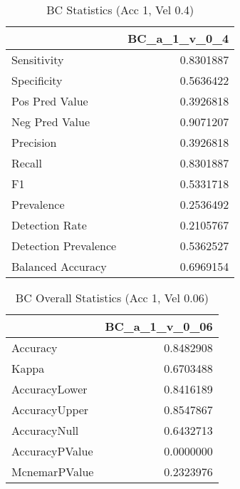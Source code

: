 \documentclass[]{article}
\begin{document}
\begin{table}[!h]

\caption{\label{tab:bc_accuracy_chunk}BC Statistics (Acc 1, Vel 0.4)}
\centering
\begin{tabular}[t]{lr}
\toprule
  & BC\_a\_1\_v\_0\_4\\
\midrule
Sensitivity & 0.8301887\\
Specificity & 0.5636422\\
Pos Pred Value & 0.3926818\\
Neg Pred Value & 0.9071207\\
Precision & 0.3926818\\
\addlinespace
Recall & 0.8301887\\
F1 & 0.5331718\\
Prevalence & 0.2536492\\
Detection Rate & 0.2105767\\
Detection Prevalence & 0.5362527\\
Balanced Accuracy & 0.6969154\\
\bottomrule
\end{tabular}
\end{table}

\begin{table}[!h]

\caption{\label{tab:bc_accuracy_chunk}BC Overall Statistics (Acc 1, Vel 0.06)}
\centering
\begin{tabular}[t]{lr}
\toprule
  & BC\_a\_1\_v\_0\_06\\
\midrule
Accuracy & 0.8482908\\
Kappa & 0.6703488\\
AccuracyLower & 0.8416189\\
AccuracyUpper & 0.8547867\\
AccuracyNull & 0.6432713\\
\addlinespace
AccuracyPValue & 0.0000000\\
McnemarPValue & 0.2323976\\
\bottomrule
\end{tabular}
\end{table}
\end{document}
